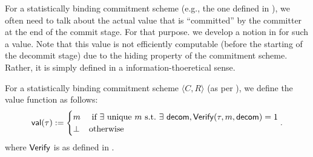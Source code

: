 For a statistically binding commitment scheme (e.g., the one defined in ), we often need to talk about the actual value that is ``committed'' by the committer at the end of the commit stage. For that purpose. we develop a notion in  for such a value. Note that this value is not efficiently computable (before the starting of the decommit stage) due to the hiding property of the commitment scheme. Rather, it is simply defined in a information-thoeretical sense.
\begin{definition}\label{def:com-val}
For a statistically binding commitment scheme $\langle C, R \rangle$ (as per ), we define the value function as follows:
\begin{equation*}
    \mathsf{val}(\tau):= 
    \begin{cases}
    m&\text{~if~}\exists\text{~unique~}m\text{~s.t.~}\exists~\mathsf{decom}, \mathsf{Verify}(\tau,m,\mathsf{decom})=1\\
    \bot &\text{otherwise}
    \end{cases}. 
\end{equation*}
where $\mathsf{Verify}$ is as defined in .
\end{definition}




